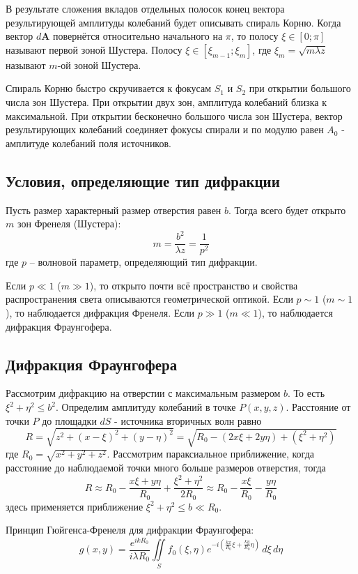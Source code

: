 В результате сложения вкладов отдельных полосок конец вектора результирующей амплитуды колебаний будет описывать спираль Корню. Когда вектор $d \boldsymbol{A}$ повернётся относительно начального на $\pi$, то полосу $\xi \in [0; \pi]$ называют первой зоной Шустера. Полосу $\xi \in [\xi_{m-1}; \xi_m]$, где $\xi_m = \sqrt{m \lambda z}$ называют $m$-ой зоной Шустера.

Спираль Корню быстро скручивается к фокусам $S_1$ и $S_2$ при открытии большого числа зон Шустера. При открытии двух зон, амплитуда колебаний близка к максимальной. При открытии бесконечно большого числа зон Шустера, вектор результирующих колебаний соединяет фокусы спирали и по модулю равен $A_0$ - амплитуде колебаний поля источников.

\subsection*{Условия, определяющие тип дифракции}

Пусть размер характерный размер отверстия равен $b$. Тогда всего будет открыто $m$ зон Френеля (Шустера):
$$
m = \frac{b^2}{\lambda z} = \frac{1}{p^2}
$$
где $p$ -- волновой параметр, определяющий тип дифракции.

Если $p \ll 1$ ($m \gg 1$), то открыто почти всё пространство и свойства распространения света описываются геометрической оптикой. Если $p \sim 1$ ($m \sim 1$), то наблюдается дифракция Френеля. Если $p \gg 1$ ($m \ll 1$), то наблюдается дифракция Фраунгофера.

\subsection*{Дифракция Фраунгофера}

Рассмотрим дифракцию на отверстии с максимальным размером $b$. То есть $\xi^2 + \eta^2 \le b^2$. Определим амплитуду колебаний в точке $P(x, y, z)$. Расстояние от точки $P$ до площадки $dS$ - источника вторичных волн равно
$$
R = \sqrt{z^2 + (x - \xi)^2 + (y - \eta)^2} = \sqrt{R_0 - (2x \xi + 2 y \eta) + (\xi^2 + \eta^2)}
$$
где $R_0 = \sqrt{x^2 + y^2 + z^2}$. Рассмотрим параксиальное приближение, когда расстояние до наблюдаемой точки много больше размеров отверстия, тогда
$$
R \approx R_0 - \frac{x\xi + y \eta}{R_0} + \frac{\xi^2 + \eta^2}{2R_0} \approx  R_0 - \frac{x\xi}{R_0} - \frac{y \eta}{R_0}
$$
здесь применяется приближение $\xi^2 + \eta^2 \le b \ll R_0$.

Принцип Гюйгенса-Френеля для дифракции Фраунгофера:
$$
g(x, y) = \frac{e^{i kR_0}}{i \lambda R_0} \iint \limits_S f_0(\xi, \eta) e^{-i \left(\frac{kx}{R_0}\xi + \frac{ky}{R_0}\eta\right)} \, d\xi \, d\eta
$$

